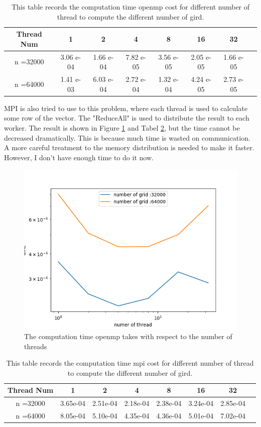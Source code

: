 \documentclass[11pt]{article}
\begin{document}
\begin{table}[htp]
    \centering
    \begin{tabular}{|c|c|c|c|c|c|c|c|}
    \hline
    Thread Num & 1 & 2 & 4 & 8 & 16 & 32 \\
    \hline
    n =32000     &3.06 e-04&1.66 e-04&7.82 e-05&3.56 e-05&2.05 e-05&1.66 e-05  \\
    \hline
    n =64000     &1.41 e-03&6.03 e-04&2.72 e-04&1.32 e-04&4.24 e-05&2.73 e-05\\
    \hline
    \end{tabular}
    \caption{This table records the computation time openmp cost for different number of thread to compute the different number of gird.}
    \label{tab:openmp table}
\end{table}

MPI is also tried to use to this problem, where each thread is used to calculate some row of the vector. The "ReduceAll" is used to distribute the result to each worker. The result is shown in Figure \ref{fig:mpi result}  and Tabel \ref{tab:mpi table}, but the time cannot be decreased dramatically.
This is because much time is wasted on communication. A more careful treatment to the memory distribution is needed to make it faster. However, I don't have enough time to do it now.
\begin{figure}
    \centering
    \includegraphics[width = 0.5\linewidth]{../CPP_code/1D_problem/mpi_version_gauss_seidel/mpi_result.png}
    \caption{The computation time openmp takes with respect to the number of threads}
    \label{fig:mpi result}
\end{figure}
\begin{table}[htp]
    \centering
    \begin{tabular}{|c|c|c|c|c|c|c|c|}
    \hline
    Thread Num & 1 & 2 & 4 & 8 & 16 & 32 \\
    \hline
    n =32000     &3.65e-04 &2.51e-04 &2.18e-04 &2.38e-04 &3.24e-04 &2.85e-04  \\
    \hline
    n =64000     &8.05e-04 &5.10e-04 &4.35e-04 &4.36e-04 &5.01e-04 &7.02e-04\\
    \hline
    \end{tabular}
    \caption{This table records the computation time mpi cost for different number of thread to compute the different number of gird.}
    \label{tab:mpi table}
\end{table}
\end{document}
